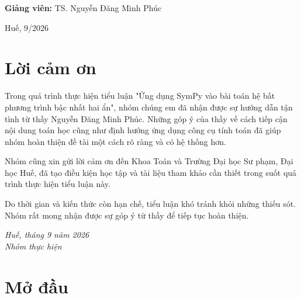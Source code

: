 \documentclass[12pt,a4paper]{report}
\begin{document}
\begin{titlepage}
\vspace{0.4cm}
\textbf{Giảng viên:} TS. Nguyễn Đăng Minh Phúc\par

\vfill
{\large Huế, 9/2026\par}
\vspace{0.3cm}

\end{titlepage}
\restoregeometry

\hypersetup{pageanchor=true}
\chapter*{Lời cảm ơn}

Trong quá trình thực hiện tiểu luận "Ứng dụng SymPy vào bài toán hệ bất phương trình bậc nhất hai ẩn", nhóm chúng em đã nhận được sự hướng dẫn tận tình từ thầy Nguyễn Đăng Minh Phúc. Những góp ý của thầy về cách tiếp cận nội dung toán học cũng như định hướng ứng dụng công cụ tính toán đã giúp nhóm hoàn thiện đề tài một cách rõ ràng và có hệ thống hơn.

Nhóm cũng xin gửi lời cảm ơn đến Khoa Toán và Trường Đại học Sư phạm, Đại học Huế, đã tạo điều kiện học tập và tài liệu tham khảo cần thiết trong suốt quá trình thực hiện tiểu luận này.

Do thời gian và kiến thức còn hạn chế, tiểu luận khó tránh khỏi những thiếu sót. Nhóm rất mong nhận được sự góp ý từ thầy để tiếp tục hoàn thiện.

\vspace{0.5cm}
\begin{flushright}
\textit{Huế, tháng 9 năm 2026}\\
\textit{Nhóm thực hiện}
\end{flushright}

\newpage

\tableofcontents
\newpage

\chapter*{Mở đầu}
\end{document}
